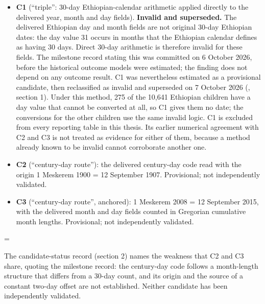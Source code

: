 \begin{itemize}
\tightlist
\item
  \textbf{C1} (``triple'': 30-day Ethiopian-calendar arithmetic applied directly to the delivered year, month and day fields). \textbf{Invalid and superseded.} The delivered Ethiopian day and month fields are not original 30-day Ethiopian dates: the day value 31 occurs in months that the Ethiopian calendar defines as having 30 days. Direct 30-day arithmetic is therefore invalid for these fields. The milestone record stating this was committed on 6 October 2026, before the historical outcome models were estimated; the finding does not depend on any outcome result. C1 was nevertheless estimated as a provisional candidate, then reclassified as invalid and superseded on 7 October 2026 (, section 1). Under this method, 275 of the 10,641 Ethiopian children have a day value that cannot be converted at all, so C1 gives them no date; the conversions for the other children use the same invalid logic. C1 is excluded from every reporting table in this thesis. Its earlier numerical agreement with C2 and C3 is not treated as evidence for either of them, because a method already known to be invalid cannot corroborate another one.
\item
  \textbf{C2} (``century-day route''): the delivered century-day code read with the origin 1 Meskerem 1900 = 12 September 1907. Provisional; not independently validated.
\item
  \textbf{C3} (``century-day route'', anchored): 1 Meskerem 2008 = 12 September 2015, with the delivered month and day fields counted in Gregorian cumulative month lengths. Provisional; not independently validated.
\end{itemize}

\par\endgroup

\begingroup\edef\ThesisSavedIndent{\the\parindent}\raggedright\parindent=\ThesisSavedIndent\relax{}

The candidate-status record (section 2) names the weakness that C2 and C3 share, quoting the milestone record: the century-day code follows a month-length structure that differs from a 30-day count, and its origin and the source of a constant two-day offset are not established. Neither candidate has been independently validated.

